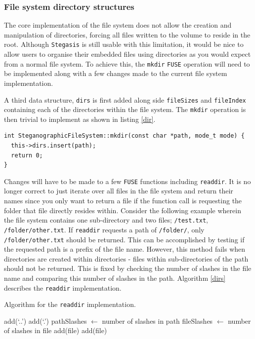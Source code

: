 \documentclass[paper=a4, fontsize=11pt,twoside]{scrartcl}
\numberwithin{table}{section}
\numberwithin{figure}{section}
\numberwithin{algorithm}{section}
\begin{document}
\subsubsection{File system directory structures}

The core implementation of the file system does not allow the creation and manipulation of directories, forcing all files written to the volume to reside in the root. Although \texttt{Stegasis} is still usable with this limitation, it would be nice to allow users to organise their embedded files using directories as you would expect from a normal file system. To achieve this, the \texttt{mkdir} \texttt{FUSE} operation will need to be implemented along with a few changes made to the current file system implementation.

A third data structure, \texttt{dirs} is first added along side \texttt{fileSizes} and \texttt{fileIndex} containing each of the directories within the file system. The \texttt{mkdir} operation is then trivial to implement as shown in listing \ref{dir}.

\begin{lstlisting}[caption={\texttt{FUSE} mkdir implementation (\texttt{fs/stegfs.cc:158}).}, frame=single, label=dir]
int SteganographicFileSystem::mkdir(const char *path, mode_t mode) {
  this->dirs.insert(path);
  return 0;
}
\end{lstlisting}

Changes will have to be made to a few \texttt{FUSE} functions including \texttt{readdir}. It is no longer correct to just iterate over all files in the file system and return their names since you only want to return a file if the function call is requesting the folder that file directly resides within. Consider the following example wherein the file system contains one sub-directory and two files; \texttt{/test.txt}, \texttt{/folder/other.txt}. If \texttt{readdir} requests a path of \texttt{/folder/}, only \texttt{/folder/other.txt} should be returned. This can be accomplished by testing if the requested path is a prefix of the file name. However, this method fails when directories are created within directories - files within sub-directories of the path should not be returned. This is fixed by checking the number of slashes in the file name and comparing this number of slashes in the path. Algorithm \ref{dirs} describes the \texttt{readdir} implementation.

\begin{algorithm}
\caption{Algorithm for the \texttt{readdir} implementation.}
\label{dirs}
\begin{algorithmic}[1]
\State add(`..')
\State add(`.')
\State pathSlashes $\gets$ number of slashes in path
	\State fileSlashes $\gets$ number of slashes in file
			\State add(file)
		\EndIf
		\State add(file)
	\EndIf
\EndFor
\end{algorithmic}
\end{algorithm}
\end{document}
